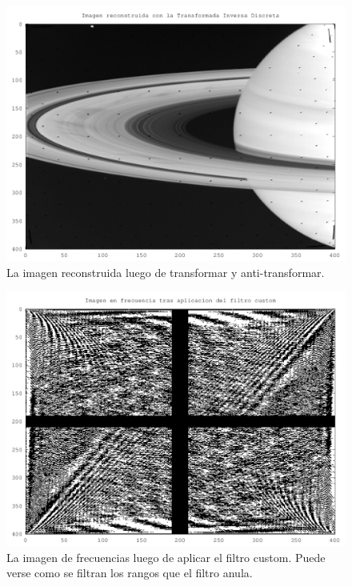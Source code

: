 \documentclass[twocolumn,a4paper,10pt]{article}
\begin{document}
\begin{figure}[H]
        \includegraphics[width=\linewidth]{../images/rebuild.png}
        \caption{La imagen reconstruida luego de transformar y anti-transformar.}
        \label{fig:rebuild}
\end{figure}

\begin{figure}[H]
        \includegraphics[width=\linewidth]{../images/customFilterFreq.png}
        \caption{La imagen de frecuencias luego de aplicar el filtro custom. Puede verse como se filtran los rangos que el filtro anula.}
        \label{fig:customFilterFrequency}
\end{figure}
\end{document}
